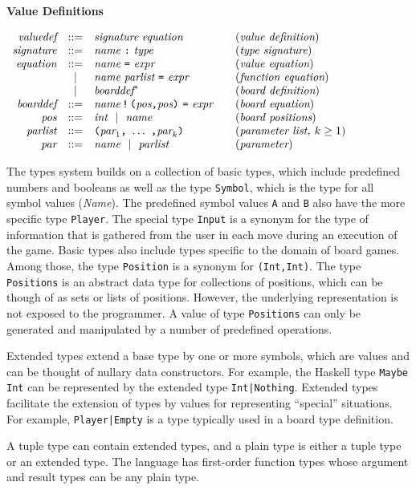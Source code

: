 \documentclass[11pt]{article}
\makeatletter
\newcommand{\prodName}[1]{&(\emph{#1})\\}
\newcommand{\nt}[1]{\textit{#1}}
\newcommand{\prog}[1]{\texttt{#1}}
\newcommand{\ORil}{\ \ |\ \ }
\newcommand{\IS}{&::=&}
\newcommand{\OR}{&|&}
\newcommand{\syntax}[2]{
  \needspace{3\baselineskip}
  \bigskip\par\noindent\textbf{#1}\par\smallskip%
  $\begin{array}{rcl@{\qquad}l}#2\end{array}$%
  \par\bigskip\noindent\ignorespaces
}
\newcommand{\lp}{\prog{(}}
\newcommand{\rp}{\prog{)}}
\newcommand{\paren}[1]{\lp#1\rp}
\newcommand{\pair}[2]{\paren{#1\prog{,}#2}}
\makeatother
\begin{document}
\syntax{Value Definitions}{
\nt{valuedef}  \IS \nt{signature}\ \nt{equation}   \prodName{value definition}
\nt{signature} \IS \nt{name}\ \prog{:}\ \nt{type}  \prodName{type signature}
\nt{equation}  \IS \nt{name}\ \prog{=}\ \nt{expr}  \prodName{value equation}
               \OR \nt{name}\ \nt{parlist}\ \prog{=}\ \nt{expr}
                   \prodName{function equation}
               \OR \nt{boarddef}^*                  \prodName{board definition}
\nt{boarddef}  \IS \nt{name}\,\prog{!}\,\pair{\nt{pos}}{\nt{pos}}\ \prog{=}\ \nt{expr}
                   \prodName{board equation}
\nt{pos}       \IS \nt{int} \ORil \nt{name}      \prodName{board positions}
\nt{parlist}   \IS \paren{\nt{par}_1\prog{,}\ \ldots\ \prog{,}\nt{par}_k}
                   \prodName{parameter list, $k\geq 1$}
\nt{par}       \IS \nt{name} \ORil \nt{parlist}   \prodName{parameter}
}
%
The types system builds on a collection of basic types, which include
predefined numbers and booleans as well as the type \prog{Symbol}, which is the
type for all symbol values (\nt{Name}). The predefined symbol values \prog{A}
and \prog{B} also have the more specific type \prog{Player}. The special type
\prog{Input} is a synonym for the type of information that is gathered from the
user in each move during an execution of the game.
%
Basic types also include types specific to the domain of board games. Among
those, the type \prog{Position} is a synonym for \prog{(Int,Int)}. The type
\prog{Positions} is an abstract data type for collections of positions, which
can be though of as sets or lists of positions. However, the underlying
representation is not exposed to the programmer. A value of type
\prog{Positions} can only be generated and manipulated by a number of
predefined operations.

Extended types extend a base type by one or more symbols, which are values and
can be thought of nullary data constructors. For example, the Haskell type
\prog{Maybe Int} can be represented by the extended type \prog{Int|Nothing}.
Extended types facilitate the extension of types by values for representing
``special'' situations. For example, \prog{Player|Empty} is a type typically
used in a board type definition.

A tuple type can contain extended types, and a plain type is either a tuple
type or an extended type. The language has first-order function types whose
argument and result types can be any plain type.
\end{document}
